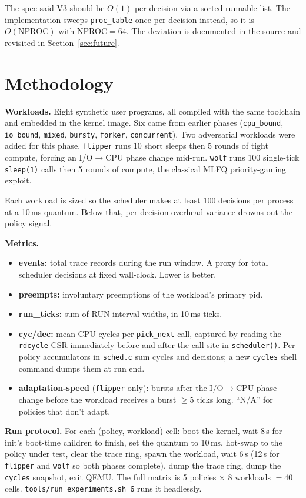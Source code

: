 \documentclass[11pt]{article}
\begin{document}
The spec said V3 should be $O(1)$ per decision via a sorted runnable list.
The implementation sweeps \texttt{proc\_table} once per decision instead, so
it is $O(\text{NPROC})$ with NPROC$=64$. The deviation is documented in the
source and revisited in Section~\ref{sec:future}.

\section{Methodology}
\label{sec:method}

\textbf{Workloads.} Eight synthetic user programs, all compiled with the
same toolchain and embedded in the kernel image. Six came from earlier
phases (\texttt{cpu\_bound}, \texttt{io\_bound}, \texttt{mixed},
\texttt{bursty}, \texttt{forker}, \texttt{concurrent}). Two adversarial
workloads were added for this phase. \texttt{flipper} runs 10 short sleeps
then 5 rounds of tight compute, forcing an I/O$\to$CPU phase change mid-run.
\texttt{wolf} runs 100 single-tick \texttt{sleep(1)} calls then 5 rounds of
compute, the classical MLFQ priority-gaming exploit.

Each workload is sized so the scheduler makes at least 100 decisions per
process at a 10\,ms quantum. Below that, per-decision overhead variance
drowns out the policy signal.

\textbf{Metrics.}
\begin{itemize}
  \item \textbf{events:} total trace records during the run window. A proxy
  for total scheduler decisions at fixed wall-clock. Lower is better.
  \item \textbf{preempts:} involuntary preemptions of the workload's
  primary pid.
  \item \textbf{run\_ticks:} sum of RUN-interval widths, in 10\,ms ticks.
  \item \textbf{cyc/dec:} mean CPU cycles per \texttt{pick\_next} call,
  captured by reading the \texttt{rdcycle} CSR immediately before and after
  the call site in \texttt{scheduler()}. Per-policy accumulators in
  \texttt{sched.c} sum cycles and decisions; a new \texttt{cycles} shell
  command dumps them at run end.
  \item \textbf{adaptation-speed} (\texttt{flipper} only): bursts after the
  I/O$\to$CPU phase change before the workload receives a burst
  $\geq 5$ ticks long. ``N/A'' for policies that don't adapt.
\end{itemize}

\textbf{Run protocol.} For each (policy, workload) cell:
boot the kernel, wait 8\,s for init's boot-time children to finish, set the
quantum to 10\,ms, hot-swap to the policy under test, clear the trace ring,
spawn the workload, wait 6\,s (12\,s for \texttt{flipper} and \texttt{wolf}
so both phases complete), dump the trace ring, dump the \texttt{cycles}
snapshot, exit QEMU. The full matrix is 5 policies $\times$ 8 workloads $=
40$ cells. \texttt{tools/run\_experiments.sh 6} runs it headlessly.
\end{document}
